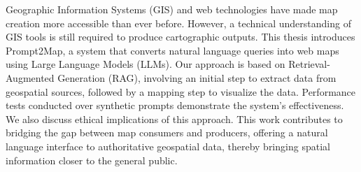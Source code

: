 
%

Geographic Information Systems (GIS) and web technologies have made map creation more accessible than ever before. However, a technical understanding of GIS tools is still required to produce cartographic outputs. 
This thesis introduces Prompt2Map, a system that converts natural language queries into web maps using Large Language Models (LLMs). 
Our approach is based on Retrieval-Augmented Generation (RAG), involving an initial step to extract data from geospatial sources, followed by a mapping step to visualize the data. 
Performance tests conducted over synthetic prompts demonstrate the system’s effectiveness. 
We also discuss ethical implications of this approach. 
This work contributes to bridging the gap between map consumers and producers, offering a natural language interface to authoritative geospatial data, thereby bringing spatial information closer to the general public.

